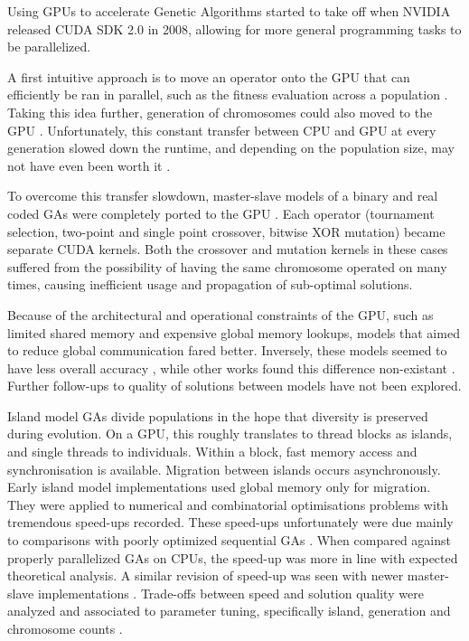 \documentclass[11pt]{article}       %
\begin{document}
Using GPUs to accelerate Genetic Algorithms started to take off when NVIDIA released CUDA SDK 2.0 in 2008, allowing for more general programming tasks to be parallelized.  

A first intuitive approach is to move an operator onto the GPU that can efficiently be ran in parallel, such as the fitness evaluation across a population \cite{Maitre2009-wd}. Taking this idea further, generation of chromosomes could also moved to the GPU \cite{Cavuoti2013-oy}. Unfortunately, this constant transfer between CPU and GPU at every generation slowed down the runtime, and depending on the population size, may not have even been worth it \cite{robilliard2008population}. 

To overcome this transfer slowdown, master-slave models of a binary and real coded GAs were completely ported to the GPU \cite{Debattisti2009-su, Arora2010-ds}. Each operator (tournament selection, two-point and single point crossover, bitwise XOR mutation) became separate CUDA kernels. Both the crossover and mutation kernels in these cases suffered from the possibility of having the same chromosome operated on many times, causing inefficient usage and propagation of sub-optimal solutions.

Because of the architectural and operational constraints of the GPU, such as limited shared memory and expensive global memory lookups, models that aimed to reduce global communication fared better. Inversely, these models seemed to have less overall accuracy \cite{Zheng2011-zr}, while other works found this difference non-existant \cite{jahne2016overview}. Further follow-ups to quality of solutions between models have not been explored.

Island model GAs divide populations in the hope that diversity is preserved during evolution. On a GPU, this roughly translates to thread blocks as islands, and single threads to individuals. Within a block, fast memory access and synchronisation is available. Migration between islands occurs asynchronously.
Early island model implementations \cite{Pospichal2010-lf, Van_Luong2010-mw} used global memory only for migration. They were applied to numerical and combinatorial optimisations problems with tremendous speed-ups recorded. These speed-ups unfortunately were due mainly to comparisons with poorly optimized sequential GAs \cite{Jaros2012-ni}. When compared against properly parallelized GAs on CPUs, the speed-up was more in line with expected theoretical analysis. A similar revision of speed-up was seen with newer master-slave implementations \cite{Sinha2015-dk}. Trade-offs between speed and solution quality were analyzed and associated to parameter tuning, specifically island, generation and chromosome counts \cite{Sun2019-fj}.
\end{document}
